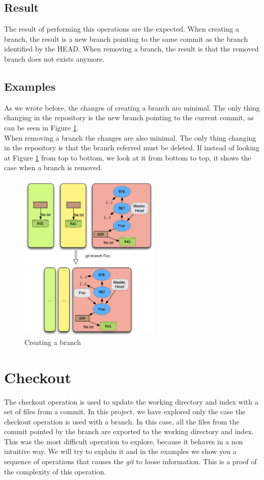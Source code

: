 \subsection{Result}
The result of performing this operations are the expected. When creating a
branch, the result is a new branch pointing to the same commit as
the branch identified by the HEAD. When removing a branch, the result
is that the removed branch does not exists anymore.

\subsection{Examples}
As we wrote before, the changes of creating a branch are minimal. The only thing
changing in the repository is the new branch pointing to the current commit, as
can be seen in Figure \ref{fig:branch}. \\

When removing a branch the changes are also minimal. The only thing
changing in the repository is that the 
branch referred must be deleted. If instead of looking at Figure
\ref{fig:branch} from top to bottom, we look at it from bottom to top,
it shows the case when a branch is removed. \\ 

\begin{figure}[!t]
   \centering
   \includegraphics[width=0.6\textwidth]{images/branch.png}
   \caption{Creating a branch}\label{fig:branch}
\end{figure}

\section{Checkout}
\label{sec:checkout}
The checkout operation is used to update the working directory and
index with a set of files from a commit. In this project, we have
explored only the case the checkout operation is used with a branch.
In this case, all the files from the commit pointed by the branch are
exported to the working directory and index. This was the most
difficult operation to explore, because it behaves in a non intuitive
way. We will try to explain it and in the examples we show you a
sequence of operations that causes the \emph{git} to loose
information. This is a proof of the complexity of this operation.

